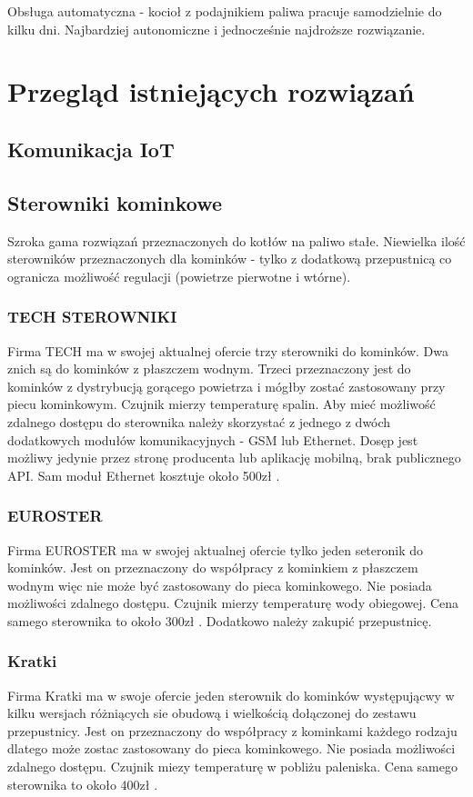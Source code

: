 \documentclass[12pt]{report}
\begin{document}
 Obsługa automatyczna - kocioł z podajnikiem paliwa pracuje samodzielnie do kilku dni. Najbardziej autonomiczne i jednocześnie najdroższe rozwiązanie.
 
 
 \chapter{Przegląd istniejących rozwiązań} 
 \section{Komunikacja IoT}
 
 
 \section{Sterowniki kominkowe}
 Szroka gama rozwiązań przeznaczonych do kotłów na paliwo stałe.
 Niewielka ilość sterowników przeznaczonych dla kominków - tylko z dodatkową przepustnicą co ogranicza możliwość regulacji (powietrze pierwotne i wtórne).
 \subsection{TECH STEROWNIKI}
 Firma TECH ma w swojej aktualnej ofercie \cite{Tech} trzy sterowniki do kominków. Dwa znich są do kominków z płaszczem wodnym. Trzeci \cite{TechSterownik} przeznaczony jest do kominków z dystrybucją gorącego powietrza i mógłby zostać zastosowany przy piecu kominkowym. Czujnik mierzy temperaturę spalin.
 Aby mieć możliwość zdalnego dostępu do sterownika należy skorzystać z jednego z dwóch dodatkowych modułów komunikacyjnych - GSM lub Ethernet. Dosęp jest możliwy jedynie przez stronę producenta lub aplikację mobilną, brak publicznego API.
 Sam moduł Ethernet kosztuje około 500zł \cite{TechEthernetCena}.
 \subsection{EUROSTER}
 Firma EUROSTER ma w swojej aktualnej ofercie \cite{Euroster} tylko jeden seteronik do kominków. Jest on \cite{EurosterSterownik} przeznaczony do współpracy z kominkiem z płaszczem wodnym więc nie może być zastosowany do pieca kominkowego. Nie posiada możliwości zdalnego dostępu. Czujnik mierzy temperaturę wody obiegowej.
 Cena samego sterownika to około 300zł \cite{EurosterSterownikCena}. Dodatkowo należy zakupić przepustnicę.
 \subsection{Kratki}
 Firma Kratki ma w swoje ofercie \cite{Kratki} jeden sterownik do kominków występującwy w kilku wersjach różniących sie obudową i wielkością dołączonej do zestawu przepustnicy.
 Jest on przeznaczony do współpracy z kominkami każdego rodzaju dlatego może zostac zastosowany do pieca kominkowego. Nie posiada możliwości zdalnego dostępu. Czujnik miezy temperaturę w pobliżu paleniska. 
 Cena samego sterownika to około 400zł \cite{KratkiSterownik}.
\end{document}

